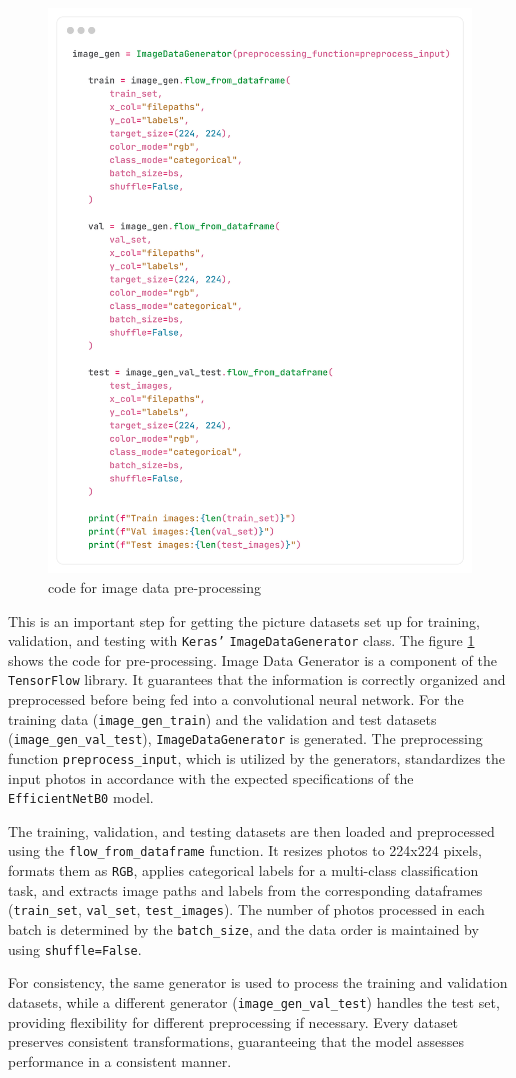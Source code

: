 \documentclass[12pt,onecolumn]{report}
\begin{document}
\begin{itemize}
\begin{figure}[h!]
        \includegraphics[width=0.6\columnwidth]{figures/imp_data_preprocessing.png}  %
        \caption{code for image data pre-processing} %
        \label{fig:imp_data_preprocessing} %
    \end{figure}
    This is an important step for getting the picture datasets set up for training, validation, and testing with \texttt{Keras'} \texttt{ImageDataGenerator} class. The figure \ref{fig:imp_data_preprocessing} shows the code for pre-processing. Image Data Generator is a component of the \texttt{TensorFlow} library. It guarantees that the information is correctly organized and preprocessed before being fed into a convolutional neural network. For the training data (\texttt{image\_gen\_train}) and the validation and test datasets (\texttt{image\_gen\_val\_test}), \texttt{ImageDataGenerator} is generated. The preprocessing function \texttt{preprocess\_input}, which is utilized by the generators, standardizes the input photos in accordance with the expected specifications of the \texttt{EfficientNetB0} model. 

    The training, validation, and testing datasets are then loaded and preprocessed using the \texttt{flow\_from\_dataframe} function. It resizes photos to 224x224 pixels, formats them as \texttt{RGB}, applies categorical labels for a multi-class classification task, and extracts image paths and labels from the corresponding dataframes (\texttt{train\_set}, \texttt{val\_set}, \texttt{test\_images}). The number of photos processed in each batch is determined by the \texttt{batch\_size}, and the data order is maintained by using \texttt{shuffle=False}.
    
    For consistency, the same generator is used to process the training and validation datasets, while a different generator (\texttt{image\_gen\_val\_test}) handles the test set, providing flexibility for different preprocessing if necessary. Every dataset preserves consistent transformations, guaranteeing that the model assesses performance in a consistent manner.
\end{itemize}
\end{document}
